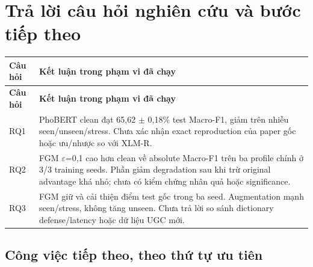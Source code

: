 \documentclass[11pt,a4paper]{article}
\newlength{\reporttablewidth}
\begin{document}
\FloatBarrier\section{Trả lời câu hỏi nghiên cứu và bước tiếp theo}

\begingroup
\small
\setlength{\tabcolsep}{4pt}
\setlength{\reporttablewidth}{\dimexpr\linewidth-2\tabcolsep\relax}
\renewcommand{\arraystretch}{1.15}
\begin{longtable}{@{}>{\raggedright\arraybackslash}p{0.31000\reporttablewidth}>{\raggedright\arraybackslash}p{0.69000\reporttablewidth}@{}}
\toprule
\textbf{Câu hỏi} & \textbf{Kết luận trong phạm vi đã chạy} \\
\midrule
\endfirsthead
\toprule
\textbf{Câu hỏi} & \textbf{Kết luận trong phạm vi đã chạy} \\
\midrule
\endhead
\bottomrule
\endlastfoot
RQ1 & PhoBERT clean đạt 65,62 \ensuremath{\pm} 0,18\% test Macro-F1, giảm trên nhiễu seen/unseen/stress. Chưa xác nhận exact reproduction của paper gốc hoặc ưu/nhược so với XLM-R. \\
RQ2 & FGM \ensuremath{\varepsilon}=0,1 cao hơn clean về absolute Macro-F1 trên ba profile chính ở 3/3 training seeds. Phần giảm degradation sau khi trừ original advantage khá nhỏ; chưa có kiểm chứng nhân quả hoặc significance. \\
RQ3 & FGM giữ và cải thiện điểm test gốc trong ba seed. Augmentation mạnh seen/stress, không tăng unseen. Chưa trả lời so sánh dictionary defense/latency hoặc dữ liệu UGC mới. \\
\end{longtable}
\endgroup

\subsection*{Công việc tiếp theo, theo thứ tự ưu tiên}
\end{document}
